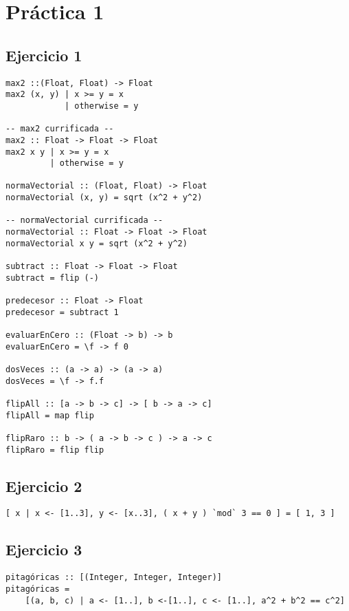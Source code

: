 \section{Práctica 1}
\subsection{Ejercicio 1}
\begin{centrado}
\begin{verbatim}
max2 ::(Float, Float) -> Float
max2 (x, y) | x >= y = x        
            | otherwise = y

-- max2 currificada --
max2 :: Float -> Float -> Float
max2 x y | x >= y = x
         | otherwise = y

normaVectorial :: (Float, Float) -> Float
normaVectorial (x, y) = sqrt (x^2 + y^2)

-- normaVectorial currificada --
normaVectorial :: Float -> Float -> Float
normaVectorial x y = sqrt (x^2 + y^2)

subtract :: Float -> Float -> Float
subtract = flip (-)

predecesor :: Float -> Float
predecesor = subtract 1

evaluarEnCero :: (Float -> b) -> b
evaluarEnCero = \f -> f 0

dosVeces :: (a -> a) -> (a -> a)
dosVeces = \f -> f.f

flipAll :: [a -> b -> c] -> [ b -> a -> c]
flipAll = map flip

flipRaro :: b -> ( a -> b -> c ) -> a -> c
flipRaro = flip flip
\end{verbatim}
\end{centrado}

\subsection{Ejercicio 2}
\begin{centrado}
\begin{verbatim}
[ x | x <- [1..3], y <- [x..3], ( x + y ) `mod` 3 == 0 ] = [ 1, 3 ]
\end{verbatim}
\end{centrado}

\newpage
\subsection{Ejercicio 3}
\begin{centrado}
\begin{verbatim}
pitagóricas :: [(Integer, Integer, Integer)]
pitagóricas = 
    [(a, b, c) | a <- [1..], b <-[1..], c <- [1..], a^2 + b^2 == c^2]
\end{verbatim}
\end{centrado}

